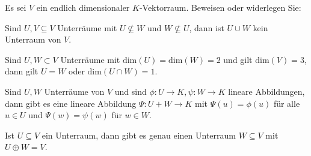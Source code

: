 \begin{Problem}
	Es sei $V$ ein endlich dimensionaler $K$-Vektorraum. Beweisen oder widerlegen Sie:
\begin{parts}
\item Sind $U,V\subseteq V$ Unterräume mit $U\not\subseteq W$ und $W\not\subseteq U$, dann ist $U\cup W$ kein Unterraum von $V$.
\item Sind $U,W\subset V$ Unterräume mit $\text{dim}(U)=\text{dim}(W)=2$ und gilt $\text{dim}(V)=3$, dann gilt $U=W$ oder $\text{dim}(U\cap W)=1$.
\item Sind $U,W$ Unterräume von $V$ und sind $\phi:U\to K,\psi:W\to K$ lineare Abbildungen, dann gibt es eine lineare Abbildung $\Psi:U+W\to K$ mit $\Psi(u)=\phi(u)$ f\"{u}r alle $u\in U$ und $\Psi(w)=\psi(w)$ f\"{u}r $w\in W$.
\item Ist $U\subseteq V$ ein Unterraum, dann gibt es genau einen Unterraum $W\subseteq V$ mit $U\oplus W=V$.
\end{parts}
\end{Problem}
